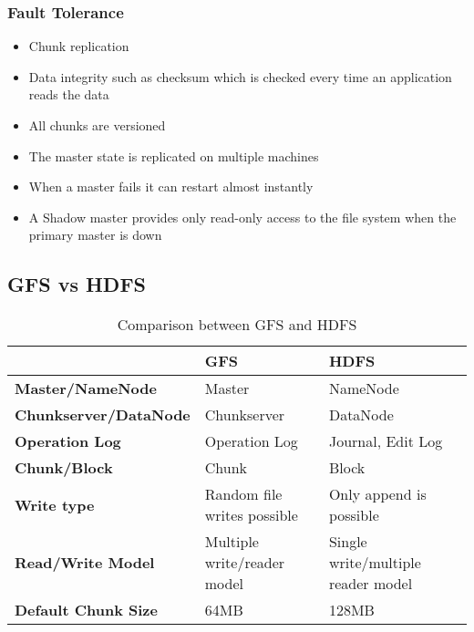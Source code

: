 \documentclass[12pt]{article}
\begin{document}
\subsubsection{Fault Tolerance}
\begin{itemize}
    \item Chunk replication
    \item Data integrity such as checksum which is checked every time an application reads the data
    \item All chunks are versioned
    \item The master state is replicated on multiple machines
    \item When a master fails it can restart almost instantly
    \item A Shadow master provides only read-only access to the file system when the primary master is down
\end{itemize}

\subsection{GFS vs HDFS}

\begin{table}[!h]
\centering
\begin{tabularx}{\textwidth}{|X|X|X|}
\hline
 & \textbf{GFS} & \textbf{HDFS} \\
\hline
\textbf{Master/NameNode} & Master & NameNode \\
\hline
\textbf{Chunkserver/DataNode} & Chunkserver & DataNode \\
\hline
\textbf{Operation Log} & Operation Log & Journal, Edit Log \\
\hline
\textbf{Chunk/Block} & Chunk & Block \\
\hline
\textbf{Write type} & Random file writes possible & Only append is possible \\
\hline
\textbf{Read/Write Model} & Multiple write/reader model & Single write/multiple reader model \\
\hline
\textbf{Default Chunk Size} & 64MB & 128MB \\
\hline
\end{tabularx}
\caption{Comparison between GFS and HDFS}
\end{table}
\end{document}
